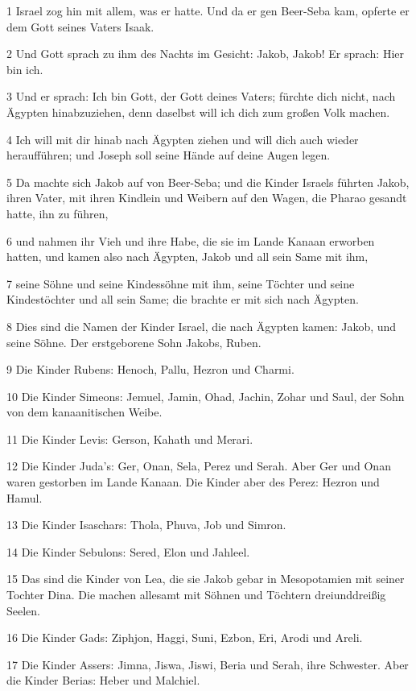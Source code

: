 \par 1 Israel zog hin mit allem, was er hatte. Und da er gen Beer-Seba kam, opferte er dem Gott seines Vaters Isaak.
\par 2 Und Gott sprach zu ihm des Nachts im Gesicht: Jakob, Jakob! Er sprach: Hier bin ich.
\par 3 Und er sprach: Ich bin Gott, der Gott deines Vaters; fürchte dich nicht, nach Ägypten hinabzuziehen, denn daselbst will ich dich zum großen Volk machen.
\par 4 Ich will mit dir hinab nach Ägypten ziehen und will dich auch wieder heraufführen; und Joseph soll seine Hände auf deine Augen legen.
\par 5 Da machte sich Jakob auf von Beer-Seba; und die Kinder Israels führten Jakob, ihren Vater, mit ihren Kindlein und Weibern auf den Wagen, die Pharao gesandt hatte, ihn zu führen,
\par 6 und nahmen ihr Vieh und ihre Habe, die sie im Lande Kanaan erworben hatten, und kamen also nach Ägypten, Jakob und all sein Same mit ihm,
\par 7 seine Söhne und seine Kindessöhne mit ihm, seine Töchter und seine Kindestöchter und all sein Same; die brachte er mit sich nach Ägypten.
\par 8 Dies sind die Namen der Kinder Israel, die nach Ägypten kamen: Jakob, und seine Söhne. Der erstgeborene Sohn Jakobs, Ruben.
\par 9 Die Kinder Rubens: Henoch, Pallu, Hezron und Charmi.
\par 10 Die Kinder Simeons: Jemuel, Jamin, Ohad, Jachin, Zohar und Saul, der Sohn von dem kanaanitischen Weibe.
\par 11 Die Kinder Levis: Gerson, Kahath und Merari.
\par 12 Die Kinder Juda's: Ger, Onan, Sela, Perez und Serah. Aber Ger und Onan waren gestorben im Lande Kanaan. Die Kinder aber des Perez: Hezron und Hamul.
\par 13 Die Kinder Isaschars: Thola, Phuva, Job und Simron.
\par 14 Die Kinder Sebulons: Sered, Elon und Jahleel.
\par 15 Das sind die Kinder von Lea, die sie Jakob gebar in Mesopotamien mit seiner Tochter Dina. Die machen allesamt mit Söhnen und Töchtern dreiunddreißig Seelen.
\par 16 Die Kinder Gads: Ziphjon, Haggi, Suni, Ezbon, Eri, Arodi und Areli.
\par 17 Die Kinder Assers: Jimna, Jiswa, Jiswi, Beria und Serah, ihre Schwester. Aber die Kinder Berias: Heber und Malchiel.
